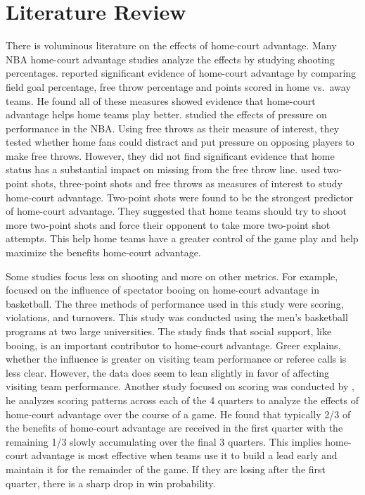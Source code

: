 \documentclass[10pt]{article}
\begin{document}
\section{Literature Review}

There is voluminous literature on the effects of home-court advantage.
Many NBA home-court advantage studies analyze the effects by studying shooting
percentages. \citet{Kotecki} reported significant evidence of home-court
advantage by comparing field goal
percentage, free throw percentage and points scored in home vs.~away teams.
He found all of these measures showed evidence that
home-court advantage helps home teams play better. \citet{Cao} studied the effects
of pressure on performance in the NBA. Using free throws as their measure of interest, 
they tested whether home
fans could distract and put pressure on opposing players to make free
throws. However, they did not find significant evidence
that home status has a substantial impact on missing from the free throw line. 
\citet{Harris} used two-point shots, three-point shots and free
throws as measures of interest to study home-court advantage. Two-point
shots were found to be the strongest predictor of home-court advantage. They
suggested that home teams should try to shoot more two-point shots and force
their opponent to take more two-point shot attempts. This help home teams have a
greater control of the game play and help maximize the benefits 
home-court advantage.

Some studies focus less on shooting and more on other metrics.
For example, \citet{Greer} focused on the influence of spectator booing on
home-court advantage in basketball. The three methods of performance used
in this study were scoring, violations, and turnovers. This study was conducted
using the men's basketball programs at two large universities. The study finds that
social support, like booing, is an important contributor to home-court advantage.
Greer explains, whether the influence is greater on visiting team performance or
referee calls is less clear. However, the data does seem to lean slightly in
favor of affecting visiting team performance. Another study focused
on scoring was conducted by \citet{Jones}, he analyzes scoring patterns across
each of the 4 quarters to analyze the effects of home-court advantage over
the course of a game. He found that typically 2/3 of the benefits of 
home-court advantage are received in the first quarter with the 
remaining 1/3 slowly accumulating over the final 3 quarters. This implies
home-court advantage is most effective when teams use it to build a 
lead early and maintain it for the remainder of the game. If they are 
losing after the first quarter, there is a sharp drop in win probability. 
\end{document}

